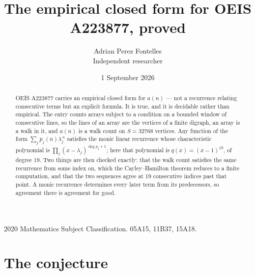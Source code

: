 \documentclass[11pt,a4paper]{article}
\title{The empirical closed form for OEIS A223877, proved}
\author{Adrian Perez Fontelles\\ \small Independent researcher}
\date{1 September 2026}
\theoremstyle{plain}
\theoremstyle{definition}
\begin{document}
\maketitle

\begin{abstract}
OEIS A223877 carries an empirical closed form for $a(n)$ --- not a recurrence relating
consecutive terms but an explicit formula. It is true, and it is decidable rather than
empirical. The entry counts arrays subject to a condition on a bounded window of consecutive lines, so the lines of an array are the
vertices of a finite digraph, an array is a walk in it, and $a(n)$ is a walk count on
$S=32768$ vertices. Any function of the form $\sum_j p_j(n)\lambda_j^{\,n}$ satisfies the
monic linear recurrence whose characteristic polynomial is
$\prod_j(x-\lambda_j)^{\deg p_j+1}$; here that polynomial is $q(x)=(x-1)^{19}$, of degree
$19$. Two things are then checked exactly: that the walk count satisfies the same
recurrence from some index on, which the Cayley--Hamilton theorem reduces to a finite
computation, and that the two sequences agree at $19$ consecutive indices past that
point. A monic recurrence determines every later term from its predecessors, so agreement
there is agreement for good.
\end{abstract}

\noindent\small 2020 Mathematics Subject Classification. 05A15, 11B37, 15A18.\normalsize

\section{The conjecture}
\end{document}
